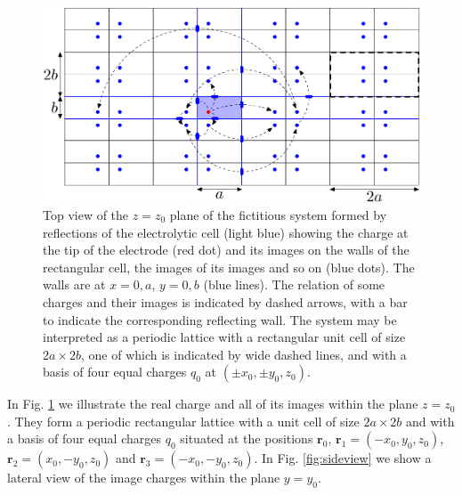 \documentclass[review,sort&compress]{cas-sc}
\begin{document}
\begin{figure}
  \centering
  \includegraphics[width=\textwidth]{fig2}
  \caption{Top view of the $z=z_0$ plane of the fictitious system formed by reflections of
    the electrolytic cell (light blue) showing the charge at the
    tip of the electrode (red dot) and its images on the walls of the
    rectangular cell, the images of its images and so on (blue
    dots). The walls are at $x=0,a$,
    $y=0,b$ (blue lines). The relation of some charges and their images is
    indicated by dashed arrows, with a bar to indicate the
    corresponding reflecting wall. The system may be interpreted as a
    periodic lattice with a rectangular unit cell of size $2a\times 2b$,
    one of which is indicated  by wide dashed lines, and with a basis of four equal
    charges $q_0$ at $(\pm x_0, \pm y_0, z_0)$.}
  \label{fig:topview}
\end{figure}
In Fig. \ref{fig:topview} we illustrate the real charge and all of
its images within the plane $z=z_0$. They form a periodic rectangular
lattice with a unit cell of size $2a\times 2b$ and with a basis of
four equal charges $q_0$ situated at the positions $\bm r_0$, $\bm
r_1=(-x_0, y_0, z_0)$, $\bm r_2=(x_0, -y_0, z_0)$ and $\bm r_3=(-x_0,
-y_0, z_0)$. In Fig. \ref{fig:sideview} we show a lateral view of the
image charges within the plane $y=y_0$.
\end{document}
